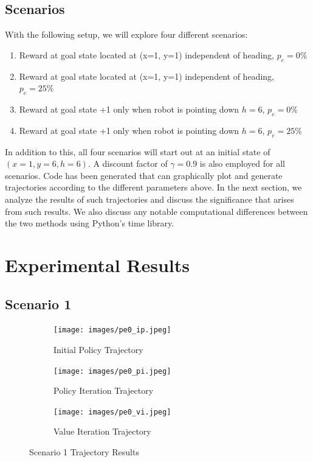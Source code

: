 \documentclass[fullpage]{article}
\begin{document}
\subsection{Scenarios}
With the following setup, we will explore four different scenarios:
\begin{enumerate}
\item Reward at goal state located at (x=1, y=1) independent of heading, $p_e = 0\%$
\item Reward at goal state located at (x=1, y=1) independent of heading, $p_e=25\%$
\item Reward at goal state +1 only when robot is pointing down $h=6$, $p_e=0\%$
\item Reward at goal state +1 only when robot is pointing down $h=6$, $p_e=25\%$
\end{enumerate}

In addition to this, all four scenarios will start out at an initial state of $(x=1, y=6, h=6)$. A discount factor of $\gamma = 0.9$ is also employed for all scenarios. Code has been generated that can graphically plot and generate trajectories according to the different parameters above. In the next section, we analyze the results of such trajectories and discuss the significance that arises from such results. We also discuss any notable computational differences between the two methods using Python's time library.

\section{Experimental Results}

\subsection{Scenario 1}

\begin{figure}[H]
\begin{subfigure}{.5\textwidth}
\centering
\texttt{[image: images/pe0\_ip.jpeg]}
\caption{Initial Policy Trajectory}
\label{fig:a}
\end{subfigure}
\begin{subfigure}{.5\textwidth}
\centering
\texttt{[image: images/pe0\_pi.jpeg]}
\caption{Policy Iteration Trajectory}
\label{fig:b}
\end{subfigure}
\begin{subfigure}{.5\textwidth}
\centering
\texttt{[image: images/pe0\_vi.jpeg]}
\caption{Value Iteration Trajectory}
\label{fig:c}
\end{subfigure}
\caption{Scenario 1 Trajectory Results}
\end{figure}
\end{document}
